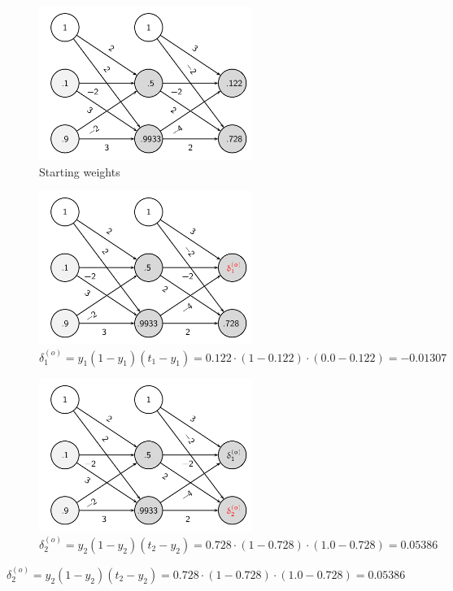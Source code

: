 \documentclass[11pt]{article}
\begin{document}
\begin{figure}[tbh!]
    \centering
    \begin{subfigure}{0.45\linewidth}
        \centering
        \includegraphics[keepaspectratio, height=5cm]{Pictures/multilayer_feedforward_example_05}
        \caption{Starting weights}
    \end{subfigure}
    \begin{subfigure}{0.45\linewidth}
        \centering
        \includegraphics[keepaspectratio, height=5cm]{Pictures/multilayer_backward_propagation_example_01}
        \caption{$\delta_1^{(o)} = y_1 (1 - y_1)(t_1 - y_1) = 0.122\cdot (1-0.122)\cdot (0.0-0.122) = -0.01307$}
    \end{subfigure}
    \begin{subfigure}{0.45\linewidth}
        \centering
        \includegraphics[keepaspectratio, height=5cm]{Pictures/multilayer_backward_propagation_example_02}
        \caption{$\delta_2^{(o)} = y_2 (1 - y_2)(t_2 - y_2) = 0.728\cdot (1-0.728)\cdot (1.0-0.728) = 0.05386$}
    \end{subfigure}

\end{figure}
\end{document}
